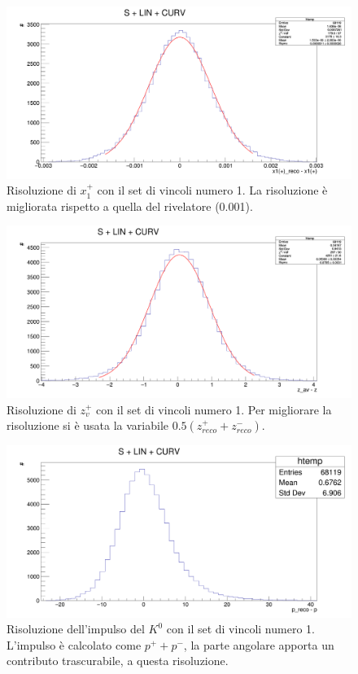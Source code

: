 \documentclass[8pt]{extarticle}
\begin{document}
\begin{figure}
	\begin{center}
		\includegraphics[scale=0.25]{set_1_x} 
		\caption{Risoluzione di $x_1^+$ con il set di vincoli numero 1. La risoluzione è migliorata rispetto a quella del rivelatore (0.001).}
		\label{fig:set_1_x}
	\end{center}
\end{figure}

\begin{figure}
	\begin{center}
		\includegraphics[scale=0.25]{set_1_z} 
		\caption{Risoluzione di $z_v^+$ con il set di vincoli numero 1. Per migliorare la risoluzione si è usata la variabile $0.5(z^+_{reco}+z^-_{reco})$.}
		\label{fig:set_1_z}
	\end{center}
\end{figure}

\begin{figure}
	\begin{center}
		\includegraphics[scale=0.25]{set_1_p} 
		\caption{Risoluzione dell'impulso del $K^0$ con il set di vincoli numero 1. L'impulso è calcolato come $p^+ + p^-$, la parte angolare apporta un contributo trascurabile, a questa risoluzione.}
		\label{fig:set_1_p}
	\end{center}
\end{figure}
\end{document}
